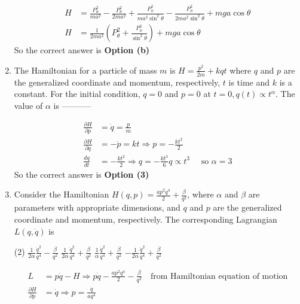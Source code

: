 \begin{enumerate}
\begin{answer}
\begin{align*}
	H&=\frac{P_{\theta}^{2}}{m a^{2}}-\frac{P_{\theta}^{2}}{2 m a^{2}}+\frac{P_{\phi}^{2}}{m a^{2} \sin ^{2} \theta}-\frac{P_{\phi}^{2}}{2 m a^{2} \sin ^{2} \theta}+m g a \cos \theta \\
	H&=\frac{1}{2 m a^{2}}\left(P_{\theta}^{2}+\frac{P_{\phi}^{2}}{\sin ^{2} \theta}\right)+m g a \cos \theta
	\end{align*}
		So the correct answer is \textbf{Option (b)}
\end{answer}
	\item  The Hamiltonian for a particle of mass $m$ is $H=\frac{p^{2}}{2 m}+k q t$ where $q$ and $p$ are the generalized coordinate and momentum, respectively, $t$ is time and $k$ is a constant. For the initial condition, $q=0$ and $p=0$ at $t=0, q(t) \propto t^{\alpha}$. The value of $\alpha$ is -----------
	{}
	\begin{answer}
		\begin{align*}
		\frac{\partial H}{\partial p}&=\dot{q}=\frac{p}{m}\\
		\frac{\partial H}{\partial q}&=-\dot{p}=k t \Rightarrow p=-\frac{k t^{2}}{2}\\
		\frac{d q}{d t}&=-\frac{k t^{2}}{2} \Rightarrow q=-\frac{k t^{3}}{6} q \propto t^{3} \quad\text{ so }\alpha=3
		\end{align*}
			So the correct answer is \textbf{Option (3)}
	\end{answer}
	\item  Consider the Hamiltonian $H(q, p)=\frac{a p^{2} q^{4}}{2}+\frac{\beta}{q^{2}}$, where $\alpha$ and $\beta$ are parameters with appropriate dimensions, and $q$ and $p$ are the generalized coordinate and momentum, respectively. The corresponding Lagrangian $L(q, \dot{q})$ is
	{}
	\begin{tasks}(2)
		\task[\textbf{a.}] $\frac{1}{2 \alpha} \frac{\dot{q}^{2}}{q^{4}}-\frac{\beta}{q^{2}}$
		\task[\textbf{b.}]$\frac{1}{2 \alpha} \frac{\dot{q}^{2}}{q^{4}}+\frac{\beta}{q^{2}}$
		\task[\textbf{c.}]$\frac{1}{\alpha} \frac{\dot{q}^{2}}{q^{4}}+\frac{\beta}{q^{2}}$
		\task[\textbf{d.}] $-\frac{1}{2 \alpha} \frac{\dot{q}^{2}}{q^{4}}+\frac{\beta}{q^{2}}$
	\end{tasks}
\begin{answer}
	\begin{align*}
	L&=p \dot{q}-H \Rightarrow p \dot{q}-\frac{a p^{2} q^{4}}{2}-\frac{\beta}{q^{2}} \quad \text{from Hamiltonian equation of motion}\\
	\frac{\partial H}{\partial p}&=\dot{q} \Rightarrow p=\frac{\dot{q}}{a q^{4}}\\

\end{align*}
\end{answer}
\end{enumerate}
